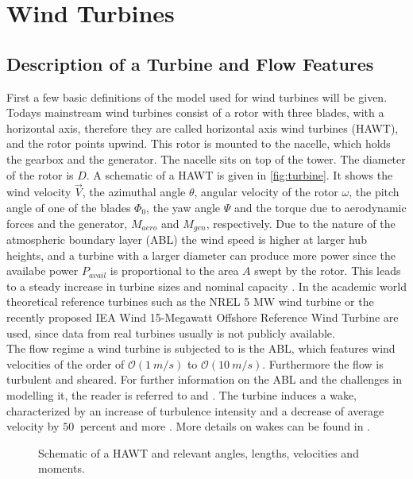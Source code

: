 \section{Wind Turbines}
\subsection{Description of a Turbine and Flow Features}
First a few basic definitions of the model used for wind turbines will be given. Todays mainstream wind turbines consist of a rotor with three blades, with a horizontal axis, therefore they are called horizontal axis wind turbines (HAWT), and the rotor points upwind.  This rotor is mounted to the nacelle, which holds the gearbox and the generator. The nacelle sits on top of the tower. The diameter of the rotor is $D$. A schematic of a HAWT is given in \autoref{fig:turbine}. It shows the wind velocity $\vec{V}$, the azimuthal angle $\theta$, angular velocity of the rotor $\omega$, the pitch angle of one of the blades $\Phi_0$, the yaw angle $\Psi$ and the torque due to aerodynamic forces and the generator, $M_{aero}$ and $M_{gen}$, respectively. Due to the nature of the atmospheric boundary layer (ABL) the wind speed is higher at larger hub heights, and a turbine with a larger diameter can produce more power since the availabe power $P_{avail}$ is proportional to the area $A$ swept by the rotor. This leads to a steady increase in turbine sizes and nominal capacity \cite{rohrig_powering_2019}. In the academic world theoretical reference turbines such as the NREL 5 MW wind turbine \cite{jonkman_definition_2009} or the recently proposed IEA Wind 15-Megawatt Offshore Reference Wind Turbine \cite{gaertner_iea_2020} are used, since data from real turbines usually is not publicly available.\cite{hansen_aerodynamics_2008} \\
The flow regime a wind turbine is subjected to is the ABL, which features wind velocities of the order of $\mathcal{O}(\SI{1}{m/s})$ to $\mathcal{O}(\SI{10}{m/s})$. Furthermore the flow is turbulent and sheared. For further information on the ABL and the challenges in modelling it, the reader is referred to \cite{kaimal_atmospheric_1994} and \cite{holtslag_stable_2013}. The turbine induces a wake, characterized by an increase of turbulence intensity and a decrease of average velocity by $\SI{50}{}$ percent and more \cite{abkar_wake_2016}. More details on wakes can be found in \cite{boersma_tutorial_2017}.
\begin{figure}[h]
	\centering
	\def\svgwidth{0.5 \textwidth}
	
	\caption{Schematic of a HAWT and relevant angles, lengths, velocities and moments.}
	\label{fig:turbine}
\end{figure} 
